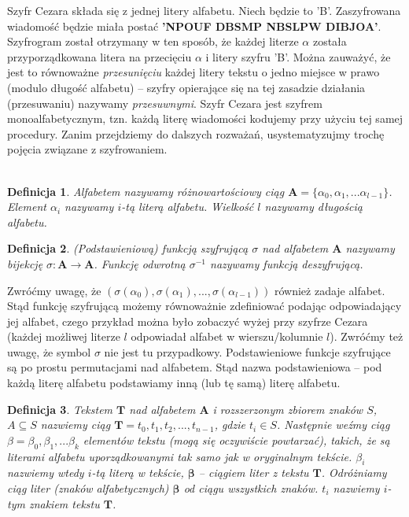 \documentclass[a4paper]{article}
\theoremstyle{defn}
\newtheorem{defn}{Definicja}[subsection]
\theoremstyle{theorem}
\theoremstyle{lemma}
\theoremstyle{cor}
\theoremstyle{fact}
\begin{document}
Szyfr Cezara składa się z jednej litery alfabetu. Niech będzie to 'B'. Zaszyfrowana wiadomość będzie miała postać \textbf{'NPOUF DBSMP NBSLPW DIBJOA'}. Szyfrogram został otrzymany w ten sposób, że każdej literze \textbf{$\alpha$} została przyporządkowana litera na przecięciu $\alpha$ i litery szyfru 'B'. Można zauważyć, że jest to równoważne \textit{przesunięciu} każdej litery tekstu o jedno miejsce w prawo (modulo długość alfabetu) – szyfry opierające się na tej zasadzie działania (przesuwaniu) nazywamy \textit{przesuwnymi}. Szyfr Cezara jest szyfrem monoalfabetycznym, tzn. każdą literę wiadomości kodujemy przy użyciu tej samej procedury. Zanim przejdziemy do dalszych rozważań, usystematyzujmy trochę pojęcia związane z szyfrowaniem.\\\\
\begin{defn}\label{defn4.1.1}
\textit{Alfabetem} nazywamy różnowartościowy ciąg $\boldsymbol{A} = \{\alpha_0, \alpha_1, ... \alpha_{l-1}\}$. Element $\alpha_i$ nazywamy $i$-tą \textit{literą} alfabetu. Wielkość $l$ nazywamy długością alfabetu.
\end{defn}
\begin{defn}\label{defn4.1.2}
\textit{(Podstawieniową) funkcją szyfrującą} $\sigma$ nad alfabetem $\boldsymbol{A}$ nazywamy bijekcję $\sigma: \boldsymbol{A} \to \boldsymbol{A}$. Funkcję odwrotną $\sigma^{-1}$ nazywamy \textit{funkcją deszyfrującą}.
\end{defn}
Zwróćmy uwagę, że $(\sigma(\alpha_0), \sigma(\alpha_1),...,\sigma(\alpha_{l-1}))$ również zadaje alfabet. Stąd funkcję szyfrującą możemy równoważnie zdefiniować podając odpowiadający jej alfabet, czego przykład można było zobaczyć wyżej przy szyfrze Cezara (każdej możliwej literze $l$ odpowiadał alfabet w wierszu/kolumnie $l$). Zwróćmy też uwagę, że symbol $\sigma$ nie jest tu przypadkowy. Podstawieniowe funkcje szyfrujące są po prostu permutacjami nad alfabetem. Stąd nazwa podstawieniowa – pod każdą literę alfabetu podstawiamy inną (lub tę samą) literę alfabetu.
\begin{defn}\label{defn4.1.3}
\textit{Tekstem} $\boldsymbol{T}$ nad alfabetem $\boldsymbol{A}$ i rozszerzonym zbiorem znaków $S$, $A \subseteq S$ nazwiemy ciąg $\boldsymbol{T} = t_0, t_1, t_2, ..., t_{n-1}$, gdzie $t_i \in S$. Następnie weźmy ciąg $\beta = \beta_0, \beta_1, ... \beta_k$ elementów tekstu (mogą się oczywiście powtarzać), takich, że są literami alfabetu uporządkowanymi tak samo jak w oryginalnym tekście. $\beta_i$ nazwiemy wtedy $i$-tą literą w tekście, $\boldsymbol{\beta}$ – ciągiem liter z tekstu $\boldsymbol{T}$. Odróżniamy ciąg liter (znaków alfabetycznych) $\boldsymbol{\beta}$ od ciągu wszystkich znaków. $t_i$ nazwiemy $i$-tym znakiem tekstu $\boldsymbol{T}$.
\end{defn}
\end{document}
